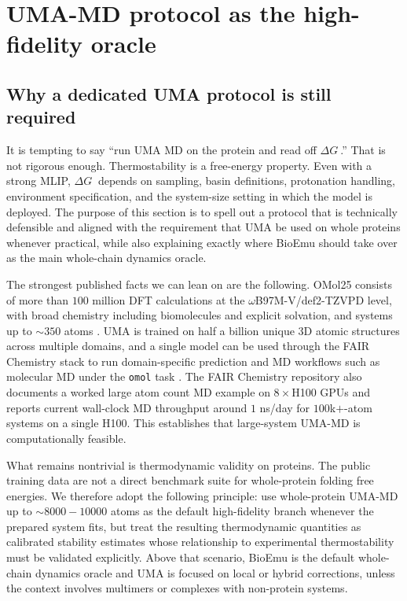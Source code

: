 \documentclass[11pt]{article}
\newcommand{\dG}{\ensuremath{\Delta G \ }}
\begin{document}
	\section{UMA-MD protocol as the high-fidelity oracle}
	\label{sec:uma}
	
	\subsection{Why a dedicated UMA protocol is still required}
	
	It is tempting to say ``run UMA MD on the protein and read off $\dG$.'' That is not rigorous enough. Thermostability is a free-energy property. Even with a strong MLIP, $\dG$ depends on sampling, basin definitions, protonation handling, environment specification, and the system-size setting in which the model is deployed. The purpose of this section is to spell out a protocol that is technically defensible and aligned with the requirement that UMA be used on whole proteins whenever practical, while also explaining exactly where BioEmu should take over as the main whole-chain dynamics oracle.
	
	The strongest published facts we can lean on are the following. OMol25 consists of more than $100$ million DFT calculations at the $\omega$B97M-V/def2-TZVPD level, with broad chemistry including biomolecules and explicit solvation, and systems up to $\sim 350$ atoms \citep{levine2025omol25}. UMA is trained on half a billion unique 3D atomic structures across multiple domains, and a single model can be used through the FAIR Chemistry stack to run domain-specific prediction and MD workflows such as molecular MD under the \texttt{omol} task \citep{wood2025uma,fairchem2025github}. The FAIR Chemistry repository also documents a worked large atom count MD example on $8\times$H100 GPUs and reports current wall-clock MD throughput around $1$ ns/day for $100$k$+$-atom systems \citep{fairchem2025github} on a single H100. This establishes that large-system UMA-MD is computationally feasible.
	
	What remains nontrivial is thermodynamic validity on proteins. The public training data are not a direct benchmark suite for whole-protein folding free energies. We therefore adopt the following principle: use whole-protein UMA-MD up to $\sim 8000-10000$ atoms as the default high-fidelity branch whenever the prepared system fits, but treat the resulting thermodynamic quantities as calibrated stability estimates whose relationship to experimental thermostability must be validated explicitly. Above that scenario, BioEmu is the default whole-chain dynamics oracle and UMA is focused on local or hybrid corrections, unless the context involves multimers or complexes with non-protein systems.
	
\end{document}
